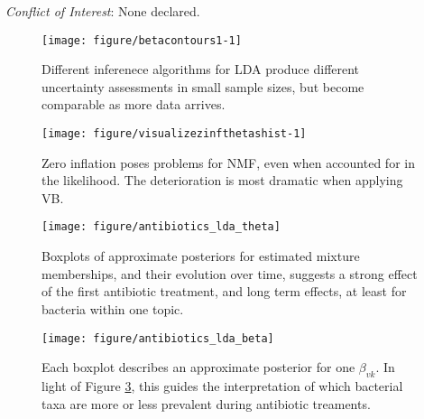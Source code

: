 \documentclass[oupdraft]{bio}
\begin{document}
{\it Conflict of Interest}: None declared.




\begin{figure}[!p]
  \centering\texttt{[image: figure/betacontours1-1]}
  \caption{Different inferenece algorithms for LDA produce different uncertainty
    assessments in small sample sizes, but become comparable as more data arrives.}
  \label{fig:lda_contours}
\end{figure}

\begin{figure}[!p]
  \centering\texttt{[image: figure/visualizezinfthetashist-1]}
  \caption{Zero inflation poses problems for NMF, even when accounted for in the likelihood. The deterioration is most dramatic when applying VB.}
  \label{fig:zinf_thetas}
\end{figure}

\begin{figure}[!p]
  \centering\texttt{[image: figure/antibiotics\_lda\_theta]}
  \caption{Boxplots of approximate posteriors for estimated mixture memberships,
    and their evolution over time, suggests a strong effect of the first
    antibiotic treatment, and long term effects, at least for bacteria within
    one topic.}
  \label{fig:antibiotics_lda_theta}
\end{figure}

\begin{figure}[!p]
  \centering\texttt{[image: figure/antibiotics\_lda\_beta]}
  \caption{Each boxplot describes an approximate posterior for one $\beta_{vk}$.
    In light of Figure \ref{fig:antibiotics_lda_theta}, this guides the
    interpretation of which bacterial taxa are more or less prevalent during
    antibiotic treaments.}
  \label{fig:antibiotics_lda_beta}
\end{figure}
\end{document}
